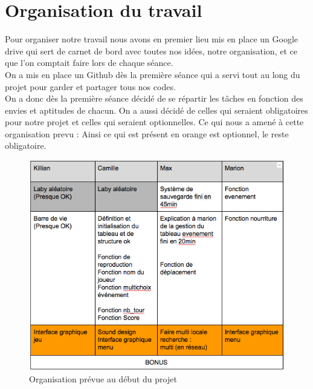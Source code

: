 \documentclass[12pt,a4paper,twoside]{article}
\begin{document}
\section{Organisation du travail}
Pour organiser notre travail nous avons en premier lieu mis en place un Google drive qui sert de carnet de bord avec toutes nos idées, notre organisation, et ce que l'on comptait faire lors de chaque séance.\\
On a mis en place un Github dès la première séance qui a servi tout au long du projet pour garder et partager tous nos codes.
\\On a donc dès la première séance décidé de se répartir les tâches en fonction des envies et aptitudes de chacun. On a aussi décidé de celles qui seraient obligatoires pour notre projet et celles qui seraient optionnelles. Ce qui nous a amené à cette organisation prevu :
Ainsi ce qui est présent en orange est optionnel, le reste obligatoire. \\
\begin {figure}[h]
\includegraphics[width=1\textwidth]{IMG/prevision.png}
\caption{\label {ref2}Organisation prévue au début du projet}
\end {figure}
\end{document}
